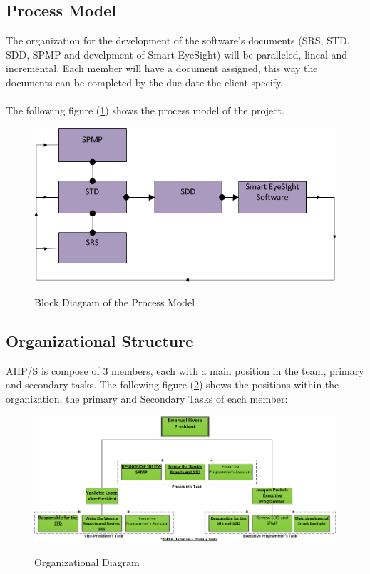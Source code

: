 \documentclass[12pt]{article}
\begin{document}
\subsection{Process Model}
The organization for the development of the software's documents (SRS, STD, SDD, SPMP and develpment of Smart EyeSight) will be paralleled, lineal and incremental. Each member will have a document assigned, this way the documents can be completed by the due date the client specify.\\\\
The following figure (\ref{org_struct}) shows the process model of the project.

\begin{figure}[H]\centering
  \includegraphics[width=6.302in]{images/block_diagram_Org_Struct}\\
  \caption{Block Diagram of the Process Model}\label{org_struct}
  \end{figure}

\subsection{Organizational Structure}
AIIP/S is compose of 3 members, each with a main position in the team, primary and secondary tasks. The following figure (\ref{org_diagram}) shows the positions within the organization, the primary and Secondary Tasks of each member:

\begin{figure}[H]\centering
  \includegraphics[width=6.0in]{images/org_diagram}\\
  \caption{Organizational Diagram}\label{org_diagram}
  \end{figure}
\end{document}
